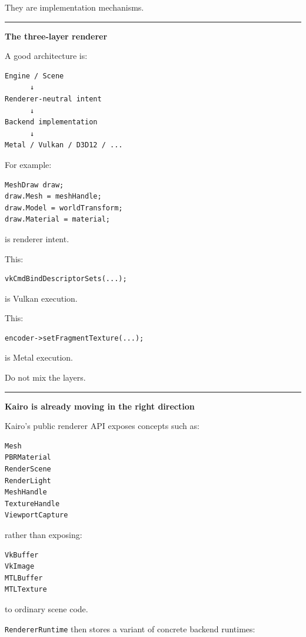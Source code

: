 They are implementation mechanisms.

\begin{center}\rule{0.5\linewidth}{0.5pt}\end{center}

\textbf{The three-layer renderer}

A good architecture is:

\begin{verbatim}
Engine / Scene
      ↓
Renderer-neutral intent
      ↓
Backend implementation
      ↓
Metal / Vulkan / D3D12 / ...
\end{verbatim}

For example:

\begin{verbatim}
MeshDraw draw;
draw.Mesh = meshHandle;
draw.Model = worldTransform;
draw.Material = material;
\end{verbatim}

is renderer intent.

This:

\begin{verbatim}
vkCmdBindDescriptorSets(...);
\end{verbatim}

is Vulkan execution.

This:

\begin{verbatim}
encoder->setFragmentTexture(...);
\end{verbatim}

is Metal execution.

Do not mix the layers.

\begin{center}\rule{0.5\linewidth}{0.5pt}\end{center}

\textbf{Kairo is already moving in the right direction}

Kairo's public renderer API exposes concepts such as:

\begin{verbatim}
Mesh
PBRMaterial
RenderScene
RenderLight
MeshHandle
TextureHandle
ViewportCapture
\end{verbatim}

rather than exposing:

\begin{verbatim}
VkBuffer
VkImage
MTLBuffer
MTLTexture
\end{verbatim}

to ordinary scene code.

\texttt{RendererRuntime} then stores a variant of concrete backend runtimes:

